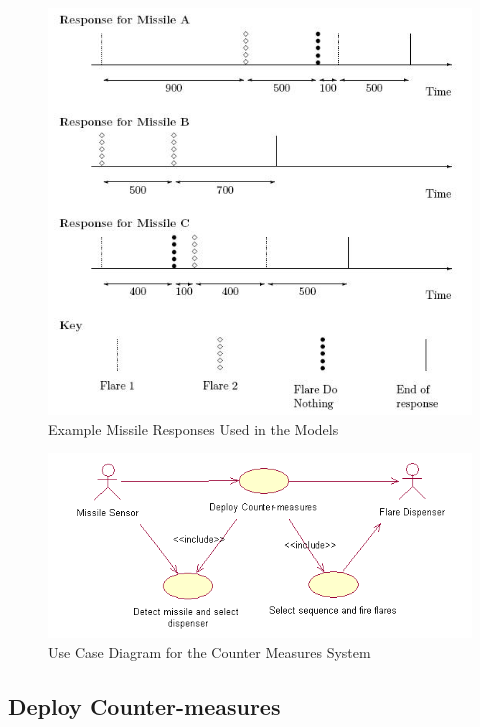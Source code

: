 \documentclass{overturerepchap}
\begin{document}
\begin{figure}
\begin{center}
\includegraphics[width=\textwidth]{figures/responses.jpg}
\end{center}
\caption{Example Missile Responses Used in the Models\label{fig:missileresp}}
\end{figure}

\begin{figure}
\begin{center}
\includegraphics[width=\textwidth]{figures/CMusecases.png}
\end{center}
\caption{Use Case Diagram for the Counter Measures System\label{fig:counteruse}}\end{figure}

\subsection{Deploy Counter-measures}
\end{document}
